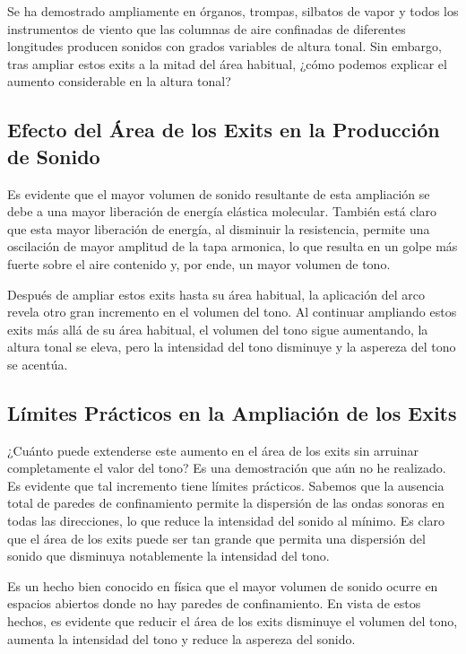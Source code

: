 \documentclass[12pt]{book}
\begin{document}
Se ha demostrado ampliamente en órganos, trompas, silbatos de vapor y todos los instrumentos de viento que las columnas de aire confinadas de diferentes longitudes producen sonidos con grados variables de altura tonal. Sin embargo, tras ampliar estos exits a la mitad del área habitual, ¿cómo podemos explicar el aumento considerable en la altura tonal? 

\subsection*{Efecto del Área de los Exits en la Producción de Sonido}

Es evidente que el mayor volumen de sonido resultante de esta ampliación se debe a una mayor liberación de energía elástica molecular. También está claro que esta mayor liberación de energía, al disminuir la resistencia, permite una oscilación de mayor amplitud de la tapa armonica, lo que resulta en un golpe más fuerte sobre el aire contenido y, por ende, un mayor volumen de tono.

Después de ampliar estos exits hasta su área habitual, la aplicación del arco revela otro gran incremento en el volumen del tono. Al continuar ampliando estos exits más allá de su área habitual, el volumen del tono sigue aumentando, la altura tonal se eleva, pero la intensidad del tono disminuye y la aspereza del tono se acentúa.

\subsection*{Límites Prácticos en la Ampliación de los Exits}

¿Cuánto puede extenderse este aumento en el área de los exits sin arruinar completamente el valor del tono? Es una demostración que aún no he realizado. Es evidente que tal incremento tiene límites prácticos. Sabemos que la ausencia total de paredes de confinamiento permite la dispersión de las ondas sonoras en todas las direcciones, lo que reduce la intensidad del sonido al mínimo. Es claro que el área de los exits puede ser tan grande que permita una dispersión del sonido que disminuya notablemente la intensidad del tono.

Es un hecho bien conocido en física que el mayor volumen de sonido ocurre en espacios abiertos donde no hay paredes de confinamiento. En vista de estos hechos, es evidente que reducir el área de los exits disminuye el volumen del tono, aumenta la intensidad del tono y reduce la aspereza del sonido.
\end{document}
